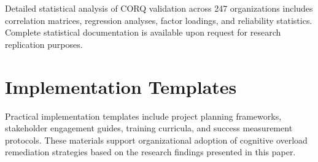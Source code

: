 \documentclass[11pt,a4paper]{article}
\begin{document}
Detailed statistical analysis of CORQ validation across 247 organizations includes correlation matrices, regression analyses, factor loadings, and reliability statistics. Complete statistical documentation is available upon request for research replication purposes.

\section{Implementation Templates}
\label{app:implementation_templates}

Practical implementation templates include project planning frameworks, stakeholder engagement guides, training curricula, and success measurement protocols. These materials support organizational adoption of cognitive overload remediation strategies based on the research findings presented in this paper.
\end{document}
